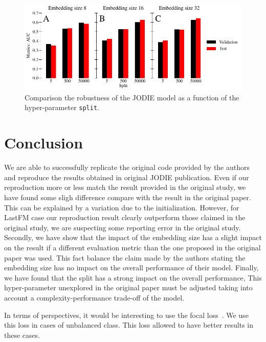 \begin{figure}[htbp]
    \centering
    \includegraphics[width = \textwidth]{image/split.pdf}
    \caption{Comparison the robustness of the JODIE model as a function of the hyper-parameter \texttt{split}.}
    \label{split}
\end{figure}

\section*{Conclusion}
We are able to successfully replicate the original code provided by the authors and reproduce the results obtained in original JODIE publication. Even if our reproduction more or less match the result provided in the original study, we have found some sligh difference compare with the result in the original paper. This can be explained by a variation due to the initialization. However, for LastFM case our reproduction result clearly outperform those claimed in the original study, we are suspecting some reporting error in the original study. Secondly, we have show that the impact of the embedding size has a slight impact on the result if a different evaluation metric than the one proposed in the original paper was used. This fact balance the claim made by the authors stating the embedding size has no impact on the overall performance of their model. Finally, we have found that the split has a strong impact on the overall performance, This hyper-parameter unexplored in the original paper must be adjusted taking into account a complexity-performance trade-off of the model.

In terms of perspectives, it would be interesting to use the focal loss~\cite{https://doi.org/10.48550/arxiv.1708.02002}. We use this loss in cases of unbalanced class. This loss allowed to have better results in these cases.

